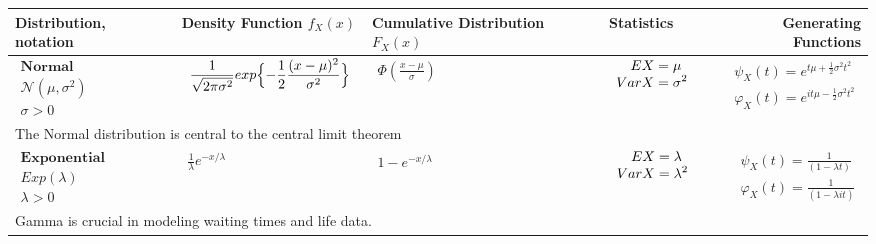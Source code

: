 \documentclass{article}
\begin{document}
\begin{landscape}
\begin{table}[ht]
\begin{tabular}{@{}l p{6.0cm} p{5cm} p{3.0cm} r@{}}
\toprule
Distribution, notation & Density Function $f_X(x)$ & Cumulative Distribution $F_X(x)$ & Statistics & Generating Functions \\ 
\midrule
$\begin{array}{l}
        \textbf{Normal} \\
        \mathcal{N}(\mu, \sigma^2) \\
        \sigma > 0
\end{array}$ & 
$\begin{array}{l}
\displaystyle  \frac{1}{\sqrt{2\pi \sigma^2}} exp \Bigl\{  -\frac{1}{2} \frac{(x-\mu)^2}{\sigma^2}\Bigr\}\\
\end{array}$ & 
$\begin{array}{l}
    \displaystyle  \Phi \left(\frac{x-\mu}{\sigma}\right)
\end{array}$ & 
$\begin{array}{l}
\displaystyle \hspace{0.36cm}  EX = \mu \\
\displaystyle VarX = \sigma^2
\end{array}$ & 
$\begin{array}{r}
\displaystyle \psi_X(t) = e^{t\mu + \frac{1}{2} \sigma^2 t^2} \\
\displaystyle \varphi_X(t) = e^{it\mu - \frac{1}{2} \sigma^2 t^2}
\end{array}$ \\
\multicolumn{4}{p{19cm}}{The Normal distribution is central to the central limit theorem} \\


$\begin{array}{l}
    \textbf{Exponential} \\
    Exp(\lambda) \\
    \lambda > 0
\end{array}$ & 

$\begin{array}{l}
\displaystyle   \frac{1}{\lambda} e^{-x / \lambda} \\
\end{array}$ & 
$\begin{array}{l}
    \displaystyle  1-e^{-x / \lambda}
\end{array}$ & 
$\begin{array}{l}
\displaystyle \hspace{0.36cm} EX = \lambda \\
\displaystyle VarX = \lambda^2
\end{array}$ & 
$\begin{array}{r}
\displaystyle \psi_X(t) = \frac{1}{(1 - \lambda t)} \\
\displaystyle \varphi_X(t) = \frac{1}{(1 - \lambda it)}
\end{array}$ \\
\multicolumn{4}{p{19cm}}{Gamma is crucial in modeling waiting times and life data.} \\




\end{tabular}
\end{table}
\end{landscape}
\end{document}
